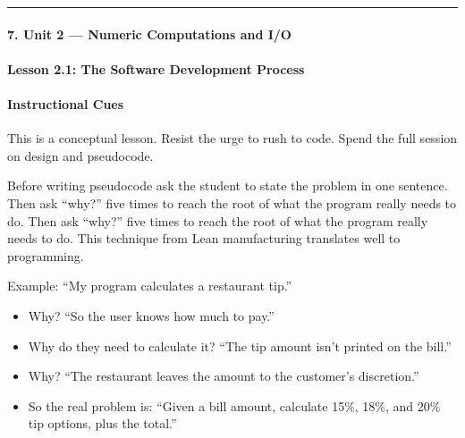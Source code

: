 \documentclass[
  justified,
  openright,
]{tufte-book}
\let\subsection\paragraph
\let\paragraph\paragraph
\let\subsection\paragraph
\let\paragraph\paragraph
\providecommand{\tightlist}{%
  \setlength{\itemsep}{0pt}\setlength{\parskip}{0pt}}
\begin{document}
\begin{center}\rule{0.5\linewidth}{0.5pt}\end{center}

\subsection{7. Unit 2 --- Numeric Computations and
I/O}\label{unit-2-numeric-computations-and-io}

\subsection{Lesson 2.1: The Software Development
Process}\label{lesson-2.1-the-software-development-process}

\paragraph{Instructional Cues}\label{instructional-cues-5}

This is a conceptual lesson. Resist the urge to rush to code. Spend the
full session on design and pseudocode.

Before writing pseudocode
ask the
student to state the problem in one sentence. Then ask ``why?'' five
times to reach the root of what the program really needs to do.
 Then ask ``why?'' five
times to reach the root of what the program really needs to do. This
technique from Lean manufacturing translates well to programming.

Example: ``My program calculates a restaurant tip.''

\begin{itemize}
\tightlist
\item
  Why? ``So the user knows how much to pay.''
\item
  Why do they need to calculate it? ``The tip amount isn't printed on
  the bill.''
\item
  Why? ``The restaurant leaves the amount to the customer's
  discretion.''
\item
  So the real problem is: ``Given a bill amount, calculate 15\%, 18\%,
  and 20\% tip options, plus the total.''
\end{itemize}
\end{document}
